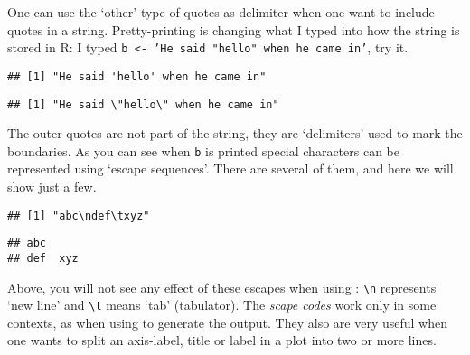 \documentclass[paper=a4,10pt,div=17,headsepline,BCOR=12mm,twoside,open=right]{scrbook}\usepackage{knitr}
\begin{document}
One can use the `other' type of quotes as delimiter when one want to include quotes in a string. Pretty-printing is changing what I typed into how the string is stored in R: I typed \texttt{b <- 'He said "hello" when he came in'}, try it.

\begin{knitrout}\footnotesize
{}\color{fgcolor}\begin{kframe}
\begin{alltt}
 \hlkwb{<-} 
\end{alltt}
\begin{verbatim}
## [1] "He said 'hello' when he came in"
\end{verbatim}
\begin{alltt}
 \hlkwb{<-} 
\end{alltt}
\begin{verbatim}
## [1] "He said \"hello\" when he came in"
\end{verbatim}
\end{kframe}
\end{knitrout}

The outer quotes are not part of the string, they are `delimiters' used to mark the boundaries. As you can see when \texttt{b} is printed special characters can be represented using `escape sequences'. There are several of them, and here we will show just a few.

\begin{knitrout}\footnotesize
{}\color{fgcolor}\begin{kframe}
\begin{alltt}
 \hlkwb{<-} 
\end{alltt}
\begin{verbatim}
## [1] "abc\ndef\txyz"
\end{verbatim}
\begin{alltt}
\end{alltt}
\begin{verbatim}
## abc
## def	xyz
\end{verbatim}
\end{kframe}
\end{knitrout}

Above, you will not see any effect of these escapes when using : \verb|\n| represents `new line' and \verb|\t| means `tab' (tabulator). The \textit{scape codes} work only in some contexts, as when using  to generate the output. They also are very useful when one wants to split an axis-label, title or label in a plot into two or more lines.
\end{document}
